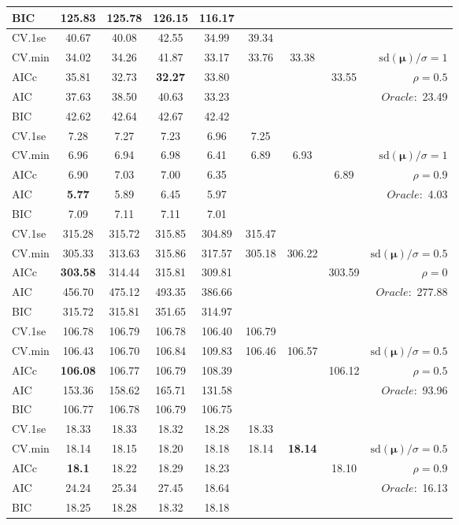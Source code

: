 \begin{table}
\begin{center}
\begin{tabular}{l*{7}{c}|r}
BIC & 125.83 & 125.78 & 126.15 & 116.17 & & & &  \\
 \hline 
CV.1se & 40.67 & 40.08 & 42.55 & 34.99 & 39.34 & & & \\
CV.min & 34.02 & 34.26 & 41.87 & 33.17 & 33.76 & 33.38 & & $\mathrm{sd}(\mathbf{\mu})/\sigma=1$ \\
AICc & 35.81 & 32.73 & {\bf 32.27} & 33.80 & & & 33.55 &  $\rho=0.5$ \\
AIC & 37.63 & 38.50 & 40.63 & 33.23 & & & &  \multirow{2}{*}{$Oracle: $ 23.49} \\
BIC & 42.62 & 42.64 & 42.67 & 42.42 & & & &  \\
 \hline 
CV.1se & 7.28 & 7.27 & 7.23 & 6.96 & 7.25 & & & \\
CV.min & 6.96 & 6.94 & 6.98 & 6.41 & 6.89 & 6.93 & & $\mathrm{sd}(\mathbf{\mu})/\sigma=1$ \\
AICc & 6.90 & 7.03 & 7.00 & 6.35 & & & 6.89 &  $\rho=0.9$ \\
AIC & {\bf 5.77} & 5.89 & 6.45 & 5.97 & & & &  \multirow{2}{*}{$Oracle: $ 4.03} \\
BIC & 7.09 & 7.11 & 7.11 & 7.01 & & & &  \\
 \hline 
CV.1se & 315.28 & 315.72 & 315.85 & 304.89 & 315.47 & & & \\
CV.min & 305.33 & 313.63 & 315.86 & 317.57 & 305.18 & 306.22 & & $\mathrm{sd}(\mathbf{\mu})/\sigma=0.5$ \\
AICc & {\bf 303.58} & 314.44 & 315.81 & 309.81 & & & 303.59 &  $\rho=0$ \\
AIC & 456.70 & 475.12 & 493.35 & 386.66 & & & &  \multirow{2}{*}{$Oracle: $ 277.88} \\
BIC & 315.72 & 315.81 & 351.65 & 314.97 & & & &  \\
 \hline 
CV.1se & 106.78 & 106.79 & 106.78 & 106.40 & 106.79 & & & \\
CV.min & 106.43 & 106.70 & 106.84 & 109.83 & 106.46 & 106.57 & & $\mathrm{sd}(\mathbf{\mu})/\sigma=0.5$ \\
AICc & {\bf 106.08} & 106.77 & 106.79 & 108.39 & & & 106.12 &  $\rho=0.5$ \\
AIC & 153.36 & 158.62 & 165.71 & 131.58 & & & &  \multirow{2}{*}{$Oracle: $ 93.96} \\
BIC & 106.77 & 106.78 & 106.79 & 106.75 & & & &  \\
 \hline 
CV.1se & 18.33 & 18.33 & 18.32 & 18.28 & 18.33 & & & \\
CV.min & 18.14 & 18.15 & 18.20 & 18.18 & 18.14 & {\bf 18.14} & & $\mathrm{sd}(\mathbf{\mu})/\sigma=0.5$ \\
AICc & {\bf 18.1} & 18.22 & 18.29 & 18.23 & & & 18.10 &  $\rho=0.9$ \\
AIC & 24.24 & 25.34 & 27.45 & 18.64 & & & &  \multirow{2}{*}{$Oracle: $ 16.13} \\
BIC & 18.25 & 18.28 & 18.32 & 18.18 & & & &  \\
 \hline 
\end{tabular}
\end{center}
\vspace{-1cm}
\end{table}



